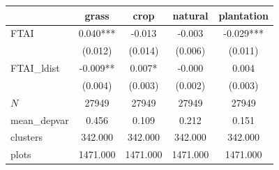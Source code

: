 {
\def\sym#1{\ifmmode^{#1}\else\(^{#1}\)\fi}
\begin{tabular}{l*{4}{c}}
\toprule
          &\multicolumn{1}{c}{grass}&\multicolumn{1}{c}{crop}&\multicolumn{1}{c}{natural}&\multicolumn{1}{c}{plantation}\\
\midrule
FTAI      &    0.040***&   -0.013   &   -0.003   &   -0.029***\\
          &  (0.012)   &  (0.014)   &  (0.006)   &  (0.011)   \\
\addlinespace
FTAI\_ldist&   -0.009** &    0.007*  &   -0.000   &    0.004   \\
          &  (0.004)   &  (0.003)   &  (0.002)   &  (0.003)   \\
\midrule
\(N\)     &    27949   &    27949   &    27949   &    27949   \\
mean\_depvar&    0.456   &    0.109   &    0.212   &    0.151   \\
clusters  &  342.000   &  342.000   &  342.000   &  342.000   \\
plots     & 1471.000   & 1471.000   & 1471.000   & 1471.000   \\
\bottomrule
\end{tabular}
}
